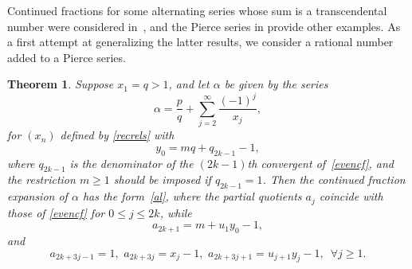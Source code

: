 \documentclass[10pt, a4paper]{amsart}
\numberwithin{equation}{section}
\newcommand\al{{\alpha}}
\theoremstyle{plain}
\newtheorem{thm}{Theorem}[section]
\theoremstyle{definition}
\begin{document}
Continued fractions for some alternating series whose
sum is a transcendental number were considered in~\cite{DaSha}, 
and the Pierce series in \cite{Var2} provide other examples. 
As a first attempt at generalizing the latter results, 
we consider a rational number added to a Pierce series. 

\begin{thm}
\label{pierce1} 
Suppose $x_1=q>1$, and let $\al$ be given by the series  
\begin{equation} 
\label{alpie1} 
\al = \frac{p}{q}+\sum_{j=2}^\infty \frac{(-1)^j}{x_j}, 
\end{equation} 
for $(x_n)$ defined by \eqref{recrels} with 
\begin{equation}
\label{y0valpie1}
y_0=mq+q_{2k-1}-1, 
\end{equation} 
where $q_{2k-1}$ is the denominator of the $(2k-1)$th convergent 
of~\eqref{evencf}, and the restriction $m\geq 1$ should be imposed 
if $q_{2k-1}=1$. 
Then  the continued fraction expansion of $\al$ has the form~\eqref{al}, 
where the partial quotients $a_j$ coincide with those of 
\eqref{evencf} for $0\leq j\leq 2k$, while 
\begin{equation}
\label{pie1cf} 
a_{2k+1}=m+u_1 y_0-1, 
\end{equation} 
and 
\begin{equation} 
\label{pie1coeff}
a_{2k+3j-1}=1, \, \, a_{2k+3j}=x_j-1, \, \, a_{2k+3j+1}=u_{j+1}y_j-1,\,\,\, 
\forall j\geq 1.
\end{equation} 
\end{thm} 
\end{document}
